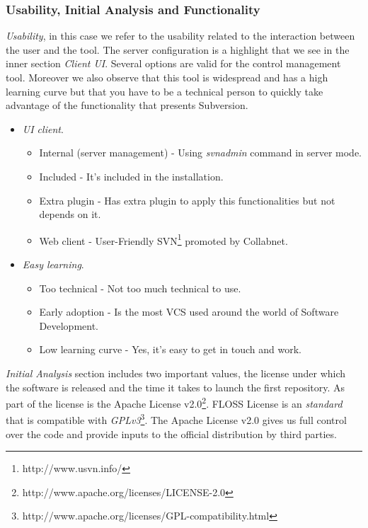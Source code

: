 \documentclass[11pt]{scrartcl}
\begin{document}
\subsubsection{Usability, Initial Analysis and Functionality}

\par \emph{Usability}, in this case we refer to the usability related to the interaction between the user and the tool. The server configuration is a highlight that we see in the inner section \emph{Client UI}. Several options are valid for the control management tool. Moreover we also observe that this tool is widespread and has a high learning curve but that you have to be a technical person to quickly take advantage of the functionality that presents Subversion.

\begin{itemize}
    \item \emph{UI client}.
	    \begin{itemize}
            \item Internal (server management) - Using \emph{svnadmin} command in server mode.
            \item Included - It's included in the installation.
            \item Extra plugin - Has extra plugin to apply this functionalities but not depends on it.
            \item Web client - User-Friendly SVN\footnote{http://www.usvn.info/} promoted by Collabnet.
        \end{itemize}

    \item \emph{Easy learning}.
	    \begin{itemize}
            \item Too technical - Not too much technical to use.
            \item Early adoption - Is the most VCS used around the world of Software Development.
            \item Low learning curve - Yes, it's easy to get in touch and work.
        \end{itemize}
\end{itemize}

\par \emph{Initial Analysis} section includes two important values​​, the license under which the software is released and the time it takes to launch the first repository. As part of the license is the Apache License v2.0\footnote{http://www.apache.org/licenses/LICENSE-2.0}. FLOSS License is an \emph{standard} that is compatible with \emph{GPLv3}\footnote{http://www.apache.org/licenses/GPL-compatibility.html}. The Apache License v2.0 gives us full control over the code and provide inputs to the official distribution by third parties.
\end{document}
